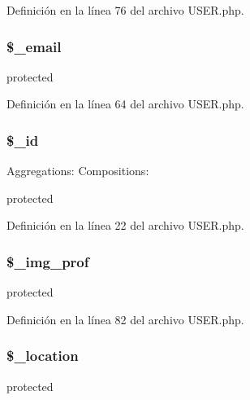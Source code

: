 Definición en la línea 76 del archivo U\-S\-E\-R.\-php.

\hypertarget{classUSER_a945b9b37db6c8c42e784df999c9ae416}{
\subsubsection[{\$\-\_\-email}]{\setlength{\rightskip}{0pt plus 5cm}\$\-\_\-email\hspace{0.3cm}{\ttfamily [protected]}}}\label{classUSER_a945b9b37db6c8c42e784df999c9ae416}
protected 

Definición en la línea 64 del archivo U\-S\-E\-R.\-php.

\hypertarget{classUSER_a64da16c4a1c7b2dc6784f6ef26341ed7}{
\subsubsection[{\$\-\_\-id}]{\setlength{\rightskip}{0pt plus 5cm}\$\-\_\-id\hspace{0.3cm}{\ttfamily [protected]}}}\label{classUSER_a64da16c4a1c7b2dc6784f6ef26341ed7}
Aggregations\-: Compositions\-:

protected 

Definición en la línea 22 del archivo U\-S\-E\-R.\-php.

\hypertarget{classUSER_a348c29ec19b54ee09130d6b2f8cb1408}{
\subsubsection[{\$\-\_\-img\-\_\-prof}]{\setlength{\rightskip}{0pt plus 5cm}\$\-\_\-img\-\_\-prof\hspace{0.3cm}{\ttfamily [protected]}}}\label{classUSER_a348c29ec19b54ee09130d6b2f8cb1408}
protected 

Definición en la línea 82 del archivo U\-S\-E\-R.\-php.

\hypertarget{classUSER_a8d591c38603c12640c6e3a6be8ad125d}{
\subsubsection[{\$\-\_\-location}]{\setlength{\rightskip}{0pt plus 5cm}\$\-\_\-location\hspace{0.3cm}{\ttfamily [protected]}}}\label{classUSER_a8d591c38603c12640c6e3a6be8ad125d}
protected 

